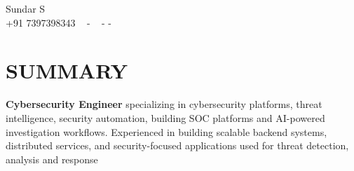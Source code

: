 \documentclass[letterpaper,11pt]{article}
\begin{document}

\vspace{-20px}
\begin{center}
    {\huge Sundar S} \\ \vspace{2pt} 
    {+91 7397398343} ~ 
    \small{-}
    \href{mailto:[sundarselvam3@gmail.com]}{\color{blue}{sundarselvam3@gmail.com}} ~ 
    \small{-}
    \href{https://www.linkedin.com/in/sundar-s-870042235/}{ \color{blue}{LinkedIn}}
    \small{-}
    \href{https://github.com/Sundar0603}{ \color{blue}{GitHub}} ~
    \vspace{-7pt}
\end{center}


\section{\color{airforceblue}SUMMARY} 
\textbf{Cybersecurity Engineer} specializing in cybersecurity platforms, threat intelligence, security automation, building SOC platforms and AI-powered investigation workflows. Experienced in building scalable backend systems, distributed services, and security-focused applications used for threat detection, analysis and response

\vspace{-10pt}



\end{document}
